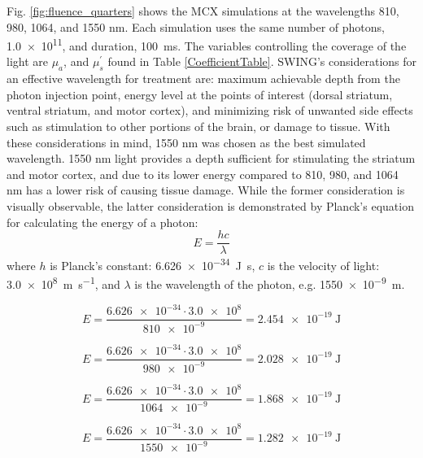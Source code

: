 \documentclass[journal,twoside,web]{ieeecolor}
\begin{document}
Fig. \ref{fig:fluence_quarters} shows the MCX simulations at the wavelengths 810, 980, 1064, and 1550 nm. Each simulation uses the same number
of photons, \num{1.0e11}, and duration, \SI{100}{\milli\second}. The variables controlling the coverage of the light are 
$\mu_{a}$, and $\mu_{s}^{'}$ found in Table \ref{CoefficientTable}. SWING's considerations for an effective wavelength for treatment are: 
maximum achievable depth from the photon injection point, energy level at the points of interest 
(dorsal striatum, ventral striatum, and motor cortex), and minimizing risk of unwanted side effects such as stimulation to other portions 
of the brain, or damage to tissue. With these considerations in mind, 1550 nm was chosen as the best simulated wavelength. 1550 nm light 
provides a depth sufficient for stimulating the striatum and motor cortex, and due to its lower energy compared to 810, 980, and 1064 nm has a 
lower risk of causing tissue damage. While the former consideration is visually observable, the latter consideration is demonstrated by 
Planck's equation for calculating the energy of a photon:
\begin{equation}
    E = \frac{hc}{\lambda}
\end{equation}
where $h$ is Planck's constant: \SI{6.626e-34}{\joule\second}, $c$ is the velocity of light: \SI{3.0e8}{\meter\per\second}, and $\lambda$ is 
the wavelength of the photon, e.g. \SI{1550e-9}{\meter}. 

\begin{equation}
    E = \frac{\num{6.626e-34}\cdot\num{3.0e8}}{\num{810e-9}} = \SI{2.454e-19}{\joule}
\end{equation}

\begin{equation}
    E = \frac{\num{6.626e-34}\cdot\num{3.0e8}}{\num{980e-9}} = \SI{2.028e-19}{\joule}
\end{equation}

\begin{equation}
    E = \frac{\num{6.626e-34}\cdot\num{3.0e8}}{\num{1064e-9}} = \SI{1.868e-19}{\joule}
\end{equation}

\begin{equation}
    E = \frac{\num{6.626e-34}\cdot\num{3.0e8}}{\num{1550e-9}} = \SI{1.282e-19}{\joule}
\end{equation}
\end{document}
